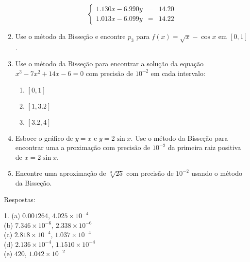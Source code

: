 \documentclass{article}
\begin{document}
\begin{enumerate}
			\[\left\{\begin{array}{lcl}
					1.130x - 6.990y & = & 14.20 \\
					1.013x - 6.099y & = & 14.22
				\end{array}\right.\]

	\item Use o m\'etodo da Bisse\c{c}\~ao e encontre $p_3$ para $f (x) = \sqrt{x} -
		\cos{x}$ em $[0,1]$.

	\item Use o m\'etodo da Bisse\c{c}\~ao para encontrar a solu\c{c}\~ao da equa\c{c}\~ao $x^3 -
		7x^2 + 14x - 6 = 0$ com precis\~ao de $10^{-2}$ em cada intervalo:
		\begin{enumerate}
			\item $[0,1]$
			\item $[1, 3.2]$
			\item $[3.2, 4]$
		\end{enumerate}
	
	\item Esboce o gr\'afico de $y = x$ e $y = 2\sin{x}$. Use o m\'etodo da
		Bisse\c{c}\~ao para encontrar uma a proxima\c{c}\~ao com precis\~ao de $10^{-2}$ da
		primeira raiz positiva de $x = 2\sin{x}$.
	

	\item Encontre uma aproxima\c{c}\~ao de $\sqrt[3]{25}$ com precis\~ao de $10^{-2}$
		usando o m\'etodo da Bisse\c{c}\~ao.
\end{enumerate}

Respostas:

\noindent{}1. (a) $0.001264$, $4.025\times{}10^{-4}$\\
(b) $7.346\times{}10^{-6}$, $2.338\times{}10^{-6}$ \\
(c) $2.818\times{}10^{-4}$, $1.037\times{}10^{-4}$ \\
(d) $2.136\times{}10^{-4}$, $1.1510\times{}10^{-4}$ \\
(e) $420$, $1.042\times{}10^{-2}$
\end{document}
